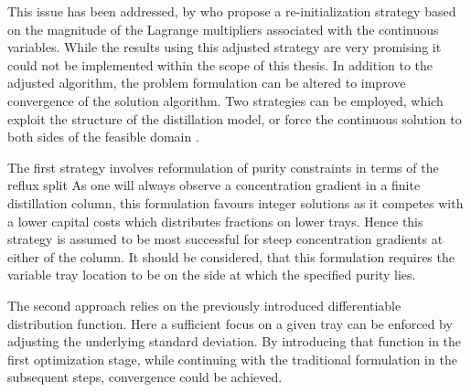         This issue has been addressed, by \cite{Kraemer.2010} who propose a re-initialization strategy based on the magnitude of
        the Lagrange multipliers associated with the continuous variables. While the results using this adjusted strategy
        are very promising it could not be implemented within the scope of this thesis. In addition to the adjusted algorithm,
        the problem formulation can be altered to improve convergence of the solution algorithm. Two strategies can
        be employed, which exploit the structure of the distillation model, or force the continuous solution to both sides
        of the feasible domain \cite{Kraemer.2009}.

        The first strategy involves reformulation of purity constraints in terms of the reflux split
        As one will always observe a concentration gradient in a finite distillation column, this formulation favours
        integer solutions as it competes with a lower capital costs which distributes fractions on lower trays. Hence
        this strategy is assumed to be most successful for steep concentration gradients at either of the column.
        It should be considered, that this formulation requires the variable tray location to be on the side at which
        the specified purity lies. 

        The second approach relies on the previously introduced differentiable distribution function. Here a sufficient
        focus on a given tray can be enforced by adjusting the underlying standard deviation. By introducing that function
        in the first optimization stage, while continuing with the traditional formulation in the subsequent steps,
        convergence could be achieved.

